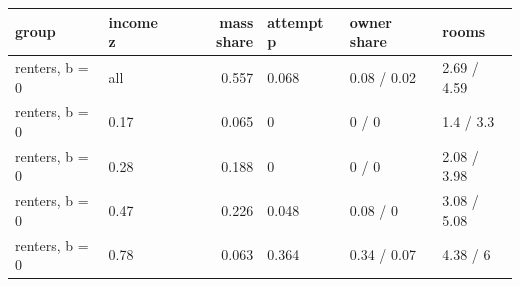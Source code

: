 \begingroup\small
\setlength{\tabcolsep}{3pt}
\renewcommand{\arraystretch}{1.04}
\begin{tabularx}{\linewidth}{XXrXXX}
\toprule
group & income z & mass share & attempt p & owner share & rooms \\
\midrule
renters, b = 0 & all & 0.557 & 0.068 & 0.08 / 0.02 & 2.69 / 4.59 \\
renters, b = 0 & 0.17 & 0.065 & 0 & 0 / 0 & 1.4 / 3.3 \\
renters, b = 0 & 0.28 & 0.188 & 0 & 0 / 0 & 2.08 / 3.98 \\
renters, b = 0 & 0.47 & 0.226 & 0.048 & 0.08 / 0 & 3.08 / 5.08 \\
renters, b = 0 & 0.78 & 0.063 & 0.364 & 0.34 / 0.07 & 4.38 / 6 \\
\bottomrule
\end{tabularx}
\endgroup
